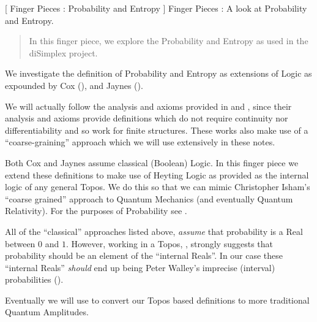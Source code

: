 
[
  Finger Pieces : Probability and Entropy
]{
  Finger Pieces : A look at Probability and Entropy.
}
\author{Stephen Gaito}

\maketitle

\begin{abstract}
  In this finger piece, we explore the Probability and Entropy as used in the
  diSimplex project.
\end{abstract}

We investigate the definition of Probability and Entropy as extensions of Logic
as expounded by Cox (\cite{cox1962algProbableInference}), and Jaynes
(\cite{jaynes1994probTh}).

We will actually follow the analysis and axioms provided in \cite{arnborgSjodin}
and \cite{dupreTipler}, since their analysis and axioms provide definitions
which do not require continuity nor differentiability and so work for finite
structures. These works also make use of a ``coarse-graining'' approach which we
will use extensively in these notes.

Both Cox and Jaynes assume classical (Boolean) Logic. In this finger piece we
extend these definitions to make use of Heyting Logic as provided as the
internal logic of any general Topos. We do this so that we can mimic Christopher
Isham's ``coarse grained'' approach to Quantum Mechanics (and eventually Quantum
Relativity). For the purposes of Probability see
\cite{isham2002reflectionsConventionalGravity}.

All of the ``classical'' approaches listed above, \emph{assume} that probability
is a Real between $0$ and $1$. However, working in a Topos,
\cite{isham2002reflectionsConventionalGravity}, strongly suggests that
probability should be an element of the ``internal Reals''. In our case these
``internal Reals'' \emph{should} end up being Peter Walley's imprecise
(interval) probabilities (\cite{walley1991impreciseProb}).

Eventually we will use \cite{goyalKnuthSkilling2009complexQuantumAmplitudes} to
convert our Topos based definitions to more traditional Quantum Amplitudes.
